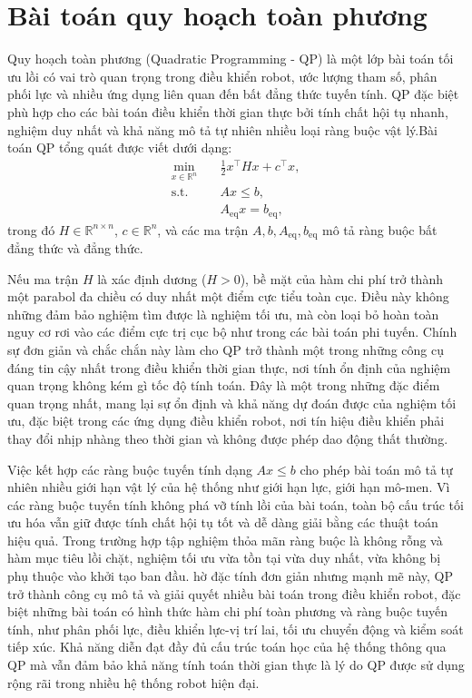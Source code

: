 \section{Bài toán quy hoạch toàn phương}
Quy hoạch toàn phương (Quadratic Programming - QP) là một lớp bài toán tối ưu lồi có vai trò quan trọng trong điều khiển robot, ước lượng tham số, phân phối lực và nhiều ứng dụng liên quan đến bất đẳng thức tuyến tính. QP đặc biệt phù hợp cho các bài toán điều khiển thời gian thực bởi tính chất hội tụ nhanh, nghiệm duy nhất và khả năng mô tả tự nhiên nhiều loại ràng buộc vật lý.Bài toán QP tổng quát được viết dưới dạng:
\begin{equation}
\label{eq:qp_general}
\begin{aligned}
\min_{x \in \mathbb{R}^n} \quad 
    & \frac{1}{2} x^\top H x + c^\top x, \\[4pt]
\text{s.t.} \quad 
    & A x \le b, \\
    & A_{\mathrm{eq}} x = b_{\mathrm{eq}},
\end{aligned}
\end{equation}
trong đó $H \in \mathbb{R}^{n \times n}$, $c \in \mathbb{R}^n$, và các ma trận $A, b, A_{\mathrm{eq}}, b_{\mathrm{eq}}$ mô tả ràng buộc bất đẳng thức và đẳng thức.

Nếu ma trận $H$ là xác định dương ($H > 0$), bề mặt của hàm chi phí trở thành một parabol đa chiều có duy nhất một điểm cực tiểu toàn cục. Điều này không những đảm bảo nghiệm tìm được là nghiệm tối ưu, mà còn loại bỏ hoàn toàn nguy cơ rơi vào các điểm cực trị cục bộ như trong các bài toán phi tuyến. Chính sự đơn giản và chắc chắn này làm cho QP trở thành một trong những công cụ đáng tin cậy nhất trong điều khiển thời gian thực, nơi tính ổn định của nghiệm quan trọng không kém gì tốc độ tính toán. Đây là một trong những đặc điểm quan trọng nhất, mang lại sự ổn định và khả năng dự đoán được của nghiệm tối ưu, đặc biệt trong các ứng dụng điều khiển robot, nơi tín hiệu điều khiển phải thay đổi nhịp nhàng theo thời gian và không được phép dao động thất thường.

Việc kết hợp các ràng buộc tuyến tính dạng $A x \le b$ cho phép bài toán mô tả tự nhiên nhiều giới hạn vật lý của hệ thống như giới hạn lực, giới hạn mô-men. Vì các ràng buộc tuyến tính không phá vỡ tính lồi của bài toán, toàn bộ cấu trúc tối ưu hóa vẫn giữ được tính chất hội tụ tốt và dễ dàng giải bằng các thuật toán hiệu quả. Trong trường hợp tập nghiệm thỏa mãn ràng buộc là không rỗng và hàm mục tiêu lồi chặt, nghiệm tối ưu vừa tồn tại vừa duy nhất, vừa không bị phụ thuộc vào khởi tạo ban đầu. hờ đặc tính đơn giản nhưng mạnh mẽ này, QP trở thành công cụ mô tả và giải quyết nhiều bài toán trong điều khiển robot, đặc biệt những bài toán có hình thức hàm chi phí toàn phương và ràng buộc tuyến tính, như phân phối lực, điều khiển lực-vị trí lai, tối ưu chuyển động và kiểm soát tiếp xúc. Khả năng diễn đạt đầy đủ cấu trúc toán học của hệ thống thông qua QP mà vẫn đảm bảo khả năng tính toán thời gian thực là lý do QP được sử dụng rộng rãi trong nhiều hệ thống robot hiện đại.